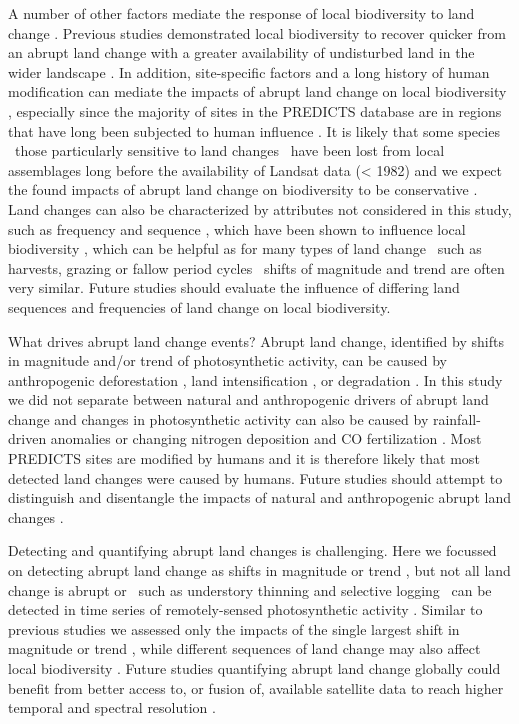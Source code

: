A number of other factors mediate the response of local biodiversity to land change \citep{Arroyo-Rodriguez2015}.  Previous studies demonstrated local biodiversity to recover quicker from an abrupt land change with a greater availability of undisturbed land in the wider landscape \citep{Turner1989,Chase2003,Shackelford2017}. In addition, site-specific factors and a long history of human modification can mediate the impacts of abrupt land change on local biodiversity \citep{Ellis2015a,Jung2016}, especially since the majority of sites in the PREDICTS database are in regions that have long been subjected to human influence \citep{Newbold2016a,Hudson2016}. It is likely that some species \textendash\ those particularly sensitive to land changes \textendash\ have been lost from local assemblages long before the availability of Landsat data (< 1982) and we expect the found impacts of abrupt land change on biodiversity to be conservative \citep{Mihoub2017}. Land changes can also be characterized by attributes not considered in this study, such as frequency and sequence \citep{Watson2014}, which have been shown to influence local biodiversity \citep{Tiemann2015,Wood2017}, which can be helpful as for many types of land change \textendash\ such as harvests, grazing or fallow period cycles \citep{Kleyer2007,Ray2013} \textendash\ shifts of magnitude and trend are often very similar. Future studies should evaluate the influence of differing land sequences and frequencies of land change on local biodiversity.

What drives abrupt land change events? Abrupt land change, identified by shifts in magnitude and/or trend of photosynthetic activity, can be caused by anthropogenic deforestation \citep{DeVries2015b}, land intensification \citep{Fensholt2012,Muller2014}, or degradation \citep{Tian2015,Aguiar2017}. In this study we did not separate between natural and anthropogenic drivers of abrupt land change and changes in photosynthetic activity can also be caused by rainfall-driven anomalies \citep{Papagiannopoulou2017} or changing nitrogen deposition and CO fertilization \citep{Zhu2016}. Most PREDICTS sites are modified by humans \citep{Newbold2016a,Hudson2016} and it is therefore likely that most detected land changes were caused by humans. Future studies should attempt to distinguish and disentangle the impacts of natural and anthropogenic abrupt land changes \citep{Curtis2018}. 

Detecting and quantifying abrupt land changes is challenging. Here we focussed on detecting abrupt land change as shifts in magnitude or trend \citep{Verbesselt2010a}, but not all land change is abrupt \citep{Vogelmann2012a} or \textendash\ such as understory thinning and selective logging \textendash\ can be detected in time series of remotely-sensed photosynthetic activity \citep{Asner2005,Peres2006}. Similar to previous studies we assessed only the impacts of the single largest shift in magnitude or trend \citep{dejong2013,Song2018}, while different sequences of land change may also affect local biodiversity \citep{Watson2014}. Future studies quantifying abrupt land change globally could benefit from better access to, or fusion of, available satellite data to reach higher temporal and spectral resolution \citep{Reiche2015,Wulder2015}.

